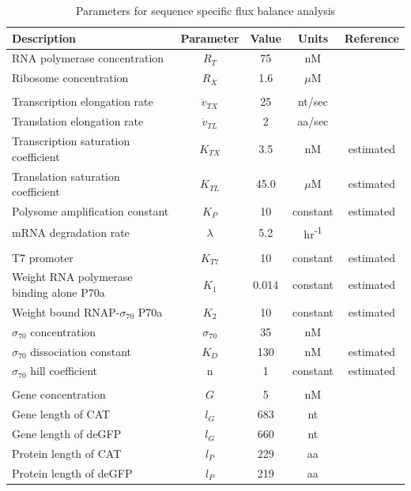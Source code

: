 \documentclass[journal=asbcd6,manuscript=article]{achemso}
\begin{document}
\begin{table}[!]
\centering
    \caption{Parameters for sequence specific flux balance analysis}
    \renewcommand{\arraystretch}{1}
    \begin{tabular}{lcccc} \toprule
        \textbf{Description} & \textbf{Parameter} & \textbf{Value} & \textbf{Units} & \textbf{Reference} \\ \toprule
        RNA polymerase concentration & $R_{T}$ & 75 & nM & \cite{Garamella:2016aa} \\
        Ribosome concentration & $R_{X}$ & 1.6 & $\mu$M & \cite{Garamella:2016aa, 2005_underwood_biotech} \\

        & & & & \\
        Transcription elongation rate & $\dot{v}_{TX}$ & 25 & nt/sec & \cite{Garamella:2016aa} \\
        Translation elongation rate & $\dot{v}_{TL}$ & 2 & aa/sec & \cite{Garamella:2016aa, 2005_underwood_biotech} \\
        Transcription saturation coefficient & $K_{TX}$ & 3.5 & nM & estimated \\
        Translation saturation coefficient & $K_{TL}$ & 45.0 & $\mu$M & estimated \\
        Polysome amplification constant & $K_{P}$ & 10 & constant & estimated \\
        mRNA degradation rate & $\lambda$ & 5.2 & hr\textsuperscript{-1} & \cite{Garamella:2016aa} \\

        & & & & \\
        T7 promoter & $K_{T7}$ & 10 & constant & estimated \\
        Weight RNA polymerase binding alone P70a & $K_{1}$ & 0.014 & constant & estimated \\
        Weight bound RNAP-$\sigma_{70}$ P70a & $K_{2}$ & 10 & constant & estimated \\
        $\sigma_{70}$ concentration & $\sigma_{70}$ & 35 & nM & \cite{Garamella:2016aa} \\
        $\sigma_{70}$ dissociation constant & $K_{D}$ & 130 & nM & estimated \\
	      $\sigma_{70}$ hill coefficient & n & 1 & constant & estimated \\

        & & & & \\
	      Gene concentration & $G$ & 5 & nM &  \cite{Garamella:2016aa} \\
        Gene length of CAT & $l_{G}$ & 683 & nt & \cite{Kigawa1995} \\
        Gene length of deGFP & $l_{G}$ & 660 & nt & \cite{Garamella:2016aa} \\
        Protein length of CAT & $l_{P}$ & 229 & aa & \cite{Kigawa1995} \\
        Protein length of deGFP & $l_{P}$ & 219 & aa & \cite{Garamella:2016aa} \\ \bottomrule
    \end{tabular}
\label{tbl:parameters}
\end{table}
\end{document}
